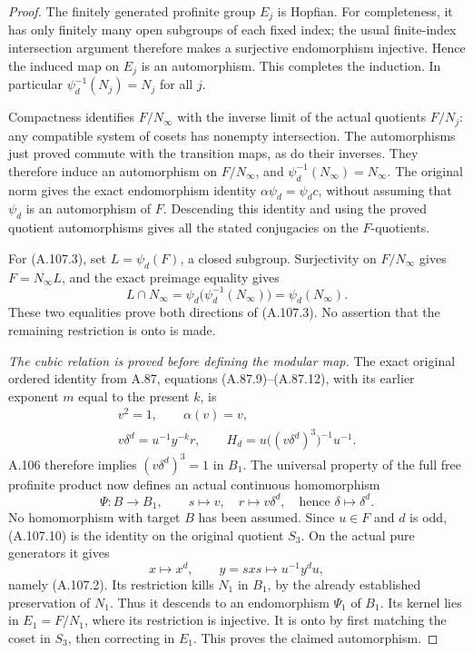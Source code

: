 \begin{proof}
The finitely generated profinite group \(E_j\) is Hopfian.
For completeness, it has only finitely many open subgroups of each
fixed index; the usual finite-index intersection argument therefore
makes a surjective endomorphism injective. Hence the induced map
on \(E_j\) is an automorphism. This completes the induction.
In particular \(\psi_d^{-1}(N_j)=N_j\) for all \(j\).

Compactness identifies \(F/N_\infty\) with the inverse limit of the
actual quotients \(F/N_j\): any compatible system of cosets has
nonempty intersection. The automorphisms just proved commute with
the transition maps, as do their inverses. They therefore induce
an automorphism on \(F/N_\infty\), and
\(\psi_d^{-1}(N_\infty)=N_\infty\).
The original norm gives the exact endomorphism identity
\(\alpha\psi_d=\psi_dc\), without assuming that \(\psi_d\) is
an automorphism of \(F\). Descending this identity and using the
proved quotient automorphisms gives all the stated conjugacies
on the \(F\)-quotients.

For (A.107.3), set \(L=\psi_d(F)\), a closed subgroup.
Surjectivity on \(F/N_\infty\) gives \(F=N_\infty L\), and the exact
preimage equality gives
\[
 L\cap N_\infty
   =\psi_d\bigl(\psi_d^{-1}(N_\infty)\bigr)
   =\psi_d(N_\infty).
 \tag{A.107.8}
\]
These two equalities prove both directions of (A.107.3).
No assertion that the remaining restriction is onto is made.

\emph{The cubic relation is proved before defining the modular map.}
The exact original ordered identity from A.87, equations
(A.87.9)--(A.87.12), with its earlier exponent \(m\) equal to the
present \(k\), is
\[
 \begin{gathered}
 v^2=1,\qquad \alpha(v)=v,\\
 v\delta^d=u^{-1}y^{-k}r,\qquad
 H_d=u\bigl((v\delta^d)^3\bigr)^{-1}u^{-1}.
 \end{gathered}
 \tag{A.107.9}
\]
A.106 therefore implies \((v\delta^d)^3=1\) in \(B_1\).
The universal property of the full free profinite product now
defines an actual continuous homomorphism
\[
 \Psi:B\longrightarrow B_1,\qquad
 s\longmapsto v,\quad r\longmapsto v\delta^d,
 \quad\text{hence }\delta\longmapsto\delta^d .
 \tag{A.107.10}
\]
No homomorphism with target \(B\) has been assumed.
Since \(u\in F\) and \(d\) is odd, (A.107.10) is the identity on the
original quotient \(S_3\). On the actual pure generators it gives
\[
 x\longmapsto x^d,\qquad
 y=sxs\longmapsto u^{-1}y^du,
\]
namely (A.107.2). Its restriction kills \(N_1\) in \(B_1\),
by the already established preservation of \(N_1\). Thus it descends
to an endomorphism \(\Psi_1\) of \(B_1\).
Its kernel lies in \(E_1=F/N_1\), where its restriction is injective.
It is onto by first matching the coset in \(S_3\), then correcting
in \(E_1\). This proves the claimed automorphism.


\end{proof}
